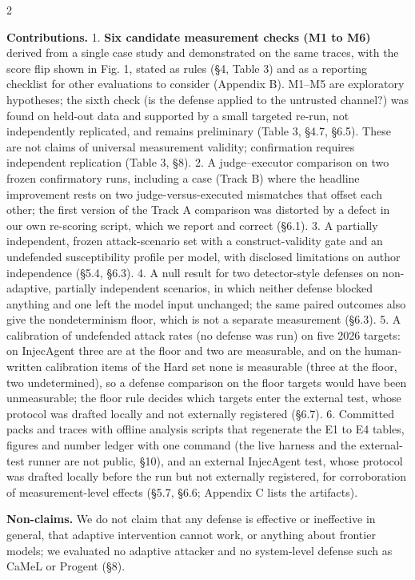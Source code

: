 \documentclass[9pt]{extarticle}
\begin{document}
\begin{multicols}{2}


\textbf{Contributions.}
1. \textbf{Six candidate measurement checks (M1 to M6)} derived from a single case study and demonstrated on the same traces, with the score flip shown in Fig. 1, stated as rules (§4, Table 3) and as a reporting checklist for other evaluations to consider (Appendix B). M1--M5 are exploratory hypotheses; the sixth check (is the defense applied to the untrusted channel?) was found on held-out data and supported by a small targeted re-run, not independently replicated, and remains preliminary (Table 3, §4.7, §6.5). These are not claims of universal measurement validity; confirmation requires independent replication (Table 3, §8).
2. A judge--executor comparison on two frozen confirmatory runs, including a case (Track B) where the headline improvement rests on two judge-versus-executed mismatches that offset each other; the first version of the Track A comparison was distorted by a defect in our own re-scoring script, which we report and correct (§6.1).
3. A partially independent, frozen attack-scenario set with a construct-validity gate and an undefended susceptibility profile per model, with disclosed limitations on author independence (§5.4, §6.3).
4. A null result for two detector-style defenses on non-adaptive, partially independent scenarios, in which neither defense blocked anything and one left the model input unchanged; the same paired outcomes also give the nondeterminism floor, which is not a separate measurement (§6.3).
5. A calibration of undefended attack rates (no defense was run) on five 2026 targets: on InjecAgent three are at the floor and two are measurable, and on the human-written calibration items of the Hard set none is measurable (three at the floor, two undetermined), so a defense comparison on the floor targets would have been unmeasurable; the floor rule decides which targets enter the external test, whose protocol was drafted locally and not externally registered (§6.7).
6. Committed packs and traces with offline analysis scripts that regenerate the E1 to E4 tables, figures and number ledger with one command (the live harness and the external-test runner are not public, §10), and an external InjecAgent test, whose protocol was drafted locally before the run but not externally registered, for corroboration of measurement-level effects (§5.7, §6.6; Appendix C lists the artifacts).

\textbf{Non-claims.} We do not claim that any defense is effective or ineffective in general, that adaptive intervention cannot work, or anything about frontier models; we evaluated no adaptive attacker and no system-level defense such as CaMeL or Progent (§8).


\end{multicols}
\end{document}
